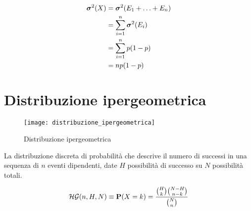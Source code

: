 \begin{proposition}
  \begin{align*}
    \boldsymbol\sigma^2(X) &= \boldsymbol\sigma^2(E_1 + \ldots + E_n) \\
    &= \sum_{i = 1}^n \boldsymbol\sigma^2(E_i) \\
    &= \sum_{i = 1}^n p (1 - p) \\
    &= n p (1 - p)
  \end{align*}
\end{proposition}



\section{Distribuzione ipergeometrica} %
\begin{figure*}
  \texttt{[image: distribuzione\_ipergeometrica]}
  \caption{Distribuzione ipergeometrica}
\end{figure*}

\begin{definition}
  \label{def:distribuzione_ipergeometrica}
  La distribuzione discreta di probabilità che descrive il numero di successi in una sequenza di  \( n \) eventi dipendenti, date \( H \) possibilità di successo su \( N \) possibilità totali.

  \[ \mathcal{HG}(n, H, N) \equiv \mathbf{P}(X = k) = \frac{\binom{H}{k} \binom{N-H}{n-k}}{\binom{N}{n}} \]
\end{definition}


